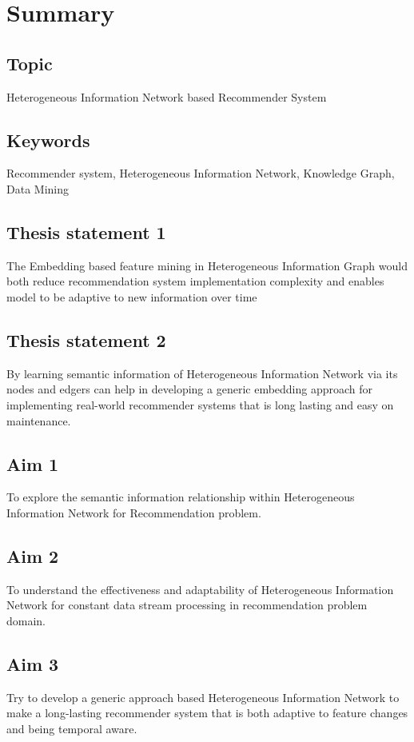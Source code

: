 \section*{Summary}

\subsection*{Topic} Heterogeneous Information Network based Recommender System

\subsection*{Keywords} 

Recommender system, Heterogeneous Information Network, Knowledge Graph, Data Mining 

\subsection*{Thesis statement 1}
The Embedding based feature mining in Heterogeneous Information Graph would both reduce recommendation system implementation complexity and enables model to be adaptive to new information over time

\subsection*{Thesis statement 2}
By learning semantic information of Heterogeneous Information Network via its nodes and edgers can help in developing a generic embedding approach for implementing real-world recommender systems that is long lasting and easy on maintenance. 

\subsection*{Aim 1}
To explore the semantic information relationship within Heterogeneous Information Network for Recommendation problem.

\subsection*{Aim 2}
To understand the effectiveness and adaptability of Heterogeneous Information Network for constant data stream processing in recommendation problem domain. 

\subsection*{Aim 3}
Try to develop a generic approach based Heterogeneous Information Network to make a long-lasting recommender system that is both adaptive to feature changes and being temporal aware. 

